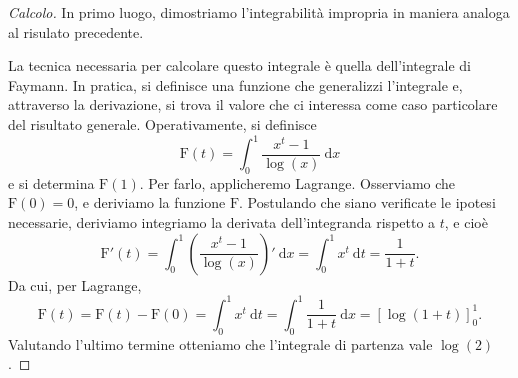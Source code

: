 \begin{proof}[Calcolo]
	In primo luogo, dimostriamo l'integrabilità impropria in maniera analoga al risulato precedente.

	La tecnica necessaria per calcolare questo integrale è quella dell'integrale di Faymann. 
	In pratica, si definisce una funzione che generalizzi l'integrale e, attraverso la derivazione, si trova il valore che ci interessa come caso particolare del risultato generale. 
	Operativamente, si definisce
	\begin{equation*}
		\mathrm{F}(t)= 
		\int^1_0 \frac{x^t-1}{ \log(x)} \: \mathrm{d}x
	\end{equation*}
	e si determina $ \mathrm{F}(1)$. 
	Per farlo, applicheremo Lagrange. 
	Osserviamo che $ \mathrm{F}(0)=0$, e deriviamo la funzione $ \mathrm{F}$. 
	Postulando che siano verificate le ipotesi necessarie, deriviamo integriamo la derivata dell'integranda rispetto a $t$, e cioè
	\begin{equation*}
		\mathrm{F}'(t)= 
		\int^1_0 \left( \frac{x^t-1}{ \log(x)} \right)' \: \mathrm{d}x= 
		\int^1_0x^t \: \mathrm{d}t= 
		\frac{1}{1+t}.
	\end{equation*}
	Da cui, per Lagrange,
	\begin{equation*}
		\mathrm{F}(t)= 
		\mathrm{F}(t)- \mathrm{F}(0)= 
		\int^1_0x^t \: \mathrm{d}t= 
		\int^1_0 \frac{1}{1+t} \: \mathrm{d}x= 
		\left[ \log(1+t) \right]^1_0.
	\end{equation*}
	Valutando l'ultimo termine otteniamo che l'integrale di partenza vale $ \log(2)$.
\end{proof}